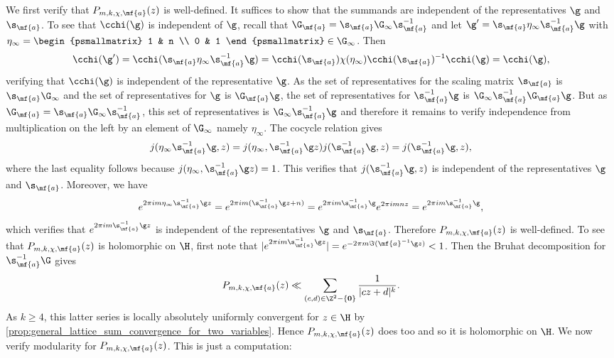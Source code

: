     We first verify that $P_{m,k,\chi,\mf{a}}(z)$ is well-defined. It suffices to show that the summands are independent of the representatives $\g$ and $\s_{\mf{a}}$. To see that $\cchi(\g)$ is independent of $\g$, recall that $\G_{\mf{a}} = \s_{\mf{a}}\G_{\infty}\s_{\mf{a}}^{-1}$ and let $\g' = \s_{\mf{a}}\eta_{\infty}\s_{\mf{a}}^{-1}\g$ with $\eta_{\infty} = \begin{psmallmatrix} 1 & n \\ 0 & 1 \end{psmallmatrix} \in \G_{\infty}$. Then
    \[
      \cchi(\g') = \cchi(\s_{\mf{a}}\eta_{\infty}\s_{\mf{a}}^{-1}\g) = \cchi(\s_{\mf{a}})\chi(\eta_{\infty})\cchi(\s_{\mf{a}})^{-1}\cchi(\g) = \cchi(\g),
    \]
    verifying that $\cchi(\g)$ is independent of the representative $\g$. As the set of representatives for the scaling matrix $\s_{\mf{a}}$ is $\s_{\mf{a}}\G_{\infty}$ and the set of representatives for $\g$ is $\G_{\mf{a}}\g$, the set of representatives for $\s_{\mf{a}}^{-1}\g$ is $\G_{\infty}\s_{\mf{a}}^{-1}\G_{\mf{a}}\g$. But as $\G_{\mf{a}} = \s_{\mf{a}}\G_{\infty}\s_{\mf{a}}^{-1}$, this set of representatives is $\G_{\infty}\s_{\mf{a}}^{-1}\g$ and therefore it remains to verify independence from multiplication on the left by an element of $\G_{\infty}$ namely $\eta_{\infty}$. The cocycle relation gives
    \[
      j(\eta_{\infty}\s_{\mf{a}}^{-1}\g,z) = j(\eta_{\infty},\s_{\mf{a}}^{-1}\g z)j(\s_{\mf{a}}^{-1}\g,z) = j(\s_{\mf{a}}^{-1}\g,z),
    \]
    where the last equality follows because $j(\eta_{\infty},\s_{\mf{a}}^{-1}\g z) = 1$. This verifies that $j(\s_{\mf{a}}^{-1}\g,z)$ is independent of the representatives $\g$ and $\s_{\mf{a}}$. Moreover, we have
    \[
      e^{2\pi im\eta_{\infty}\s_{\mf{a}}^{-1}\g z} = e^{2\pi im(\s_{\mf{a}}^{-1}\g z+n)} = e^{2\pi im\s_{\mf{a}}^{-1}\g}e^{2\pi imnz} = e^{2\pi im\s_{\mf{a}}^{-1}\g},
    \]
    which verifies that $e^{2\pi im\s_{\mf{a}}^{-1}\g z}$ is independent of the representatives $\g$ and $\s_{\mf{a}}$. Therefore $P_{m,k,\chi,\mf{a}}(z)$ is well-defined. To see that $P_{m,k,\chi,\mf{a}}(z)$ is holomorphic on $\H$, first note that $|e^{2\pi im\s_{\mf{a}}^{-1}\g z}| = e^{-2\pi m\Im(\mf{a}^{-1}\g z)} < 1$. Then the Bruhat decomposition for $\s_{\mf{a}}^{-1}\G$ gives
    \[
      P_{m,k,\chi,\mf{a}}(z) \ll \sum_{(c,d) \in \Z^{2}-\{\mathbf{0}\}}\frac{1}{|cz+d|^{k}}.
    \]
    As $k \ge 4$, this latter series is locally absolutely uniformly convergent for $z \in \H$ by \cref{prop:general_lattice_sum_convergence_for_two_variables}. Hence $P_{m,k,\chi,\mf{a}}(z)$ does too and so it is holomorphic on $\H$. We now verify modularity for $P_{m,k,\chi,\mf{a}}(z)$. This is just a computation:

